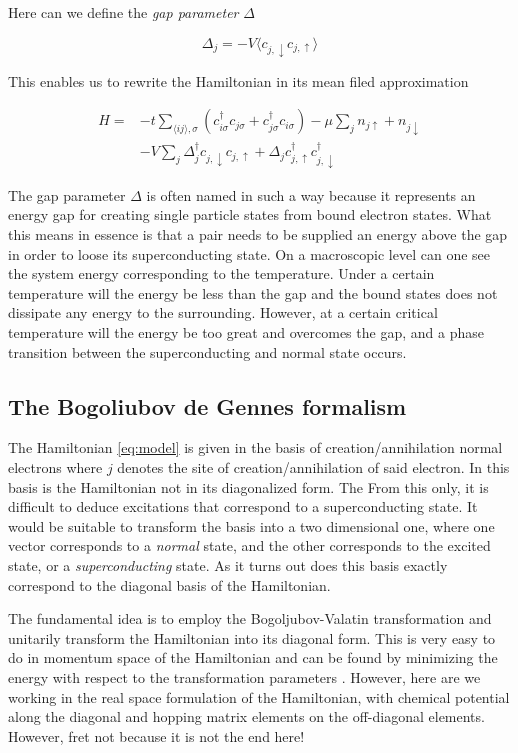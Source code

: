 \documentclass[11pt]{article}
\begin{document}
Here can we define the \textit{gap parameter} $\Delta$ 

\begin{equation}\label{eq:self-cons-v1}
	\Delta_j = -V \langle c_{j, \downarrow}c_{j, \uparrow} \rangle
\end{equation}

This enables us to rewrite the Hamiltonian in its mean filed approximation

\begin{align}\label{eq:mf-model}
	H = &-t \sum_{\langle i j\rangle, \sigma}\left(c_{i \sigma}^{\dagger} c_{j \sigma} + c_{j \sigma}^{\dagger} c_{i \sigma}\right) - \mu \sum_j n_{j \uparrow}+n_{j \downarrow}  \nonumber \\ 
      &- V \sum_j \Delta_j^\dagger c_{j, \downarrow}c_{j, \uparrow} + \Delta_j c_{j, \uparrow}^{\dagger}c_{j, \downarrow}^{\dagger}
\end{align}

The gap parameter $\Delta$ is often named in such a way because it represents an energy gap for creating single particle states from bound electron states. What this means in essence is that a pair needs to be supplied an energy above the gap in order to loose its superconducting state. On a macroscopic level can one see the system energy corresponding to the temperature. Under a certain temperature will the energy be less than the gap and the bound states does not dissipate any energy to the surrounding. However, at a certain critical temperature will the energy be too great and overcomes the gap, and a phase transition between the superconducting and normal state occurs. 


\subsection{The Bogoliubov de Gennes formalism}
The Hamiltonian \eqref{eq:model} is given in the basis of creation/annihilation normal electrons where $j$ denotes the site of creation/annihilation of said electron. In this basis is the Hamiltonian not in its diagonalized form. The  From this only, it is difficult to deduce excitations that correspond to a superconducting state. It would be suitable to transform the basis into a two dimensional one, where one vector corresponds to a \textit{normal} state, and the other corresponds to the excited state, or a \textit{superconducting} state. As it turns out does this basis exactly correspond to the diagonal basis of the Hamiltonian. 

The fundamental idea is to employ the Bogoljubov-Valatin transformation and unitarily transform the Hamiltonian into its diagonal form. This is very easy to do in momentum space of the Hamiltonian and can be found by minimizing the energy with respect to the transformation parameters \cite{annettSuperconductivitySuperfluidsCondensates2004}. However, here are we working in the real space formulation of the Hamiltonian, with chemical potential along the diagonal and hopping matrix elements on the off-diagonal elements. However, fret not because it is not the end here! 
 
\end{document}
